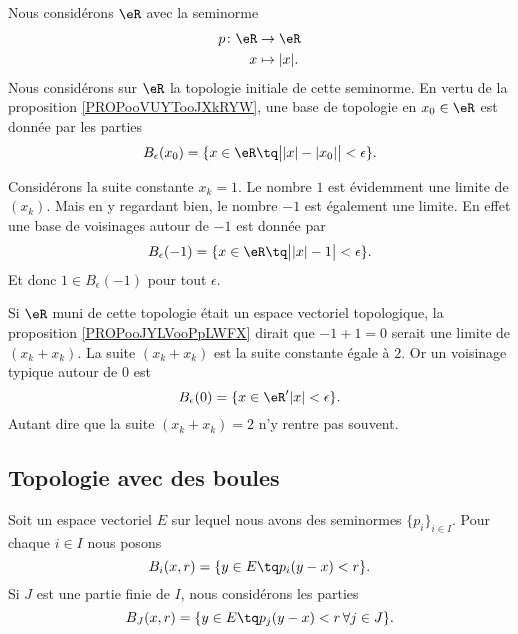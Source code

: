 \begin{example}
	Nous considérons \( \eR\) avec la seminorme
	\begin{equation}
		\begin{aligned}
			p\colon \eR & \to \eR        \\
			x           & \mapsto | x |.
		\end{aligned}
	\end{equation}
	Nous considérons sur \( \eR\) la topologie initiale de cette seminorme. En vertu de la proposition \ref{PROPooVUYTooJXkRYW}, une base de topologie en \( x_0\in \eR\) est donnée par les parties
	\begin{equation}
		B_{\epsilon}(x_0)=\{ x\in \eR\tq \big|  | x |-| x_0 |  \big|<\epsilon \}.
	\end{equation}

	Considérons la suite constante \( x_k=1\). Le nombre \( 1\) est évidemment une limite de \( (x_k)\). Mais en y regardant bien, le nombre \( -1\) est également une limite. En effet une base de voisinages autour de \( -1\) est donnée par
	\begin{equation}
		B_{\epsilon}(-1)=\{ x\in \eR\tq \big|   | x |-1 \big|<\epsilon \}.
	\end{equation}
	Et donc \( 1\in B_{\epsilon}(-1)\) pour tout \( \epsilon\).

	Si \( \eR\) muni de cette topologie était un espace vectoriel topologique, la proposition \ref{PROPooJYLVooPpLWFX} dirait que \( -1+1=0\) serait une limite de \( (x_k+x_k)\). La suite \( (x_k+x_k)\) est la suite constante égale à \( 2\). Or un voisinage typique autour de \( 0\) est
	\begin{equation}
		B_{\epsilon}(0)=\{ x\in \eR\rq | x |<\epsilon \}.
	\end{equation}
	Autant dire que la suite \( (x_k+x_k)=2\) n'y rentre pas souvent.
\end{example}

\subsection{Topologie avec des boules}

\begin{definition}		\label{DEFooROXMooCpmTwa}
	Soit un espace vectoriel \( E\) sur lequel nous avons des seminormes \( \{ p_i \}_{i\in I}\). Pour chaque \( i\in I\) nous posons
	\begin{equation}
		B_i(x,r)=\{ y\in E\tq p_i(y-x)<r \}.
	\end{equation}
	Si \( J\) est une partie finie de \( I\), nous considérons les parties
	\begin{equation}
		B_J(x,r)=\{ y\in E\tq p_j(y-x)<r\,\forall j\in J \}.
	\end{equation}
\end{definition}

